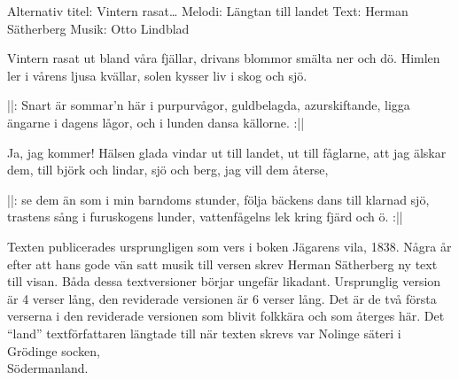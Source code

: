 \begin{song}

\begin{songmeta}
Alternativ titel: Vintern rasat\ldots
Melodi: Längtan till landet
Text: Herman Sätherberg
Musik: Otto Lindblad
\end{songmeta}

\begin{songtext}
Vintern rasat ut bland våra fjällar,
drivans blommor smälta ner och dö.
Himlen ler i vårens ljusa kvällar,
solen kysser liv i skog och sjö.

||: Snart är sommar'n här i purpurvågor,
guldbelagda, azurskiftande,
ligga ängarne i dagens lågor,
och i lunden dansa källorne. :||

Ja, jag kommer! Hälsen glada vindar
ut till landet, ut till fåglarne,
att jag älskar dem, till björk och lindar,
sjö och berg, jag vill dem återse,

||: se dem än som i min barndoms stunder,
följa bäckens dans till klarnad sjö,
trastens sång i furuskogens lunder,
vattenfågelns lek kring fjärd och ö. :||
\end{songtext}
\newpage
\begin{songnotes}
Texten publicerades ursprungligen som vers i boken Jägarens vila, 1838. Några år
efter att hans gode vän satt musik till versen skrev Herman Sätherberg ny text
till visan. Båda dessa textversioner börjar ungefär likadant. Ursprunglig
version är 4 verser lång, den reviderade versionen är 6 verser lång. Det är de
två första verserna i den reviderade versionen som blivit folkkära och som
återges här.
Det \textquotedblleft{}land\textquotedblright{} textförfattaren längtade till
när texten skrevs var Nolinge säteri i Grödinge socken, \\
Södermanland.
\end{songnotes}

\end{song}
